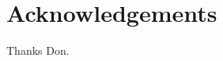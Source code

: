 \documentclass[openany]{book}
\begin{document}
\chapter*{Acknowledgements}
Thanks Don.





\tableofcontents
\listoffigures
\listoftables








\newpage



\end{document}
